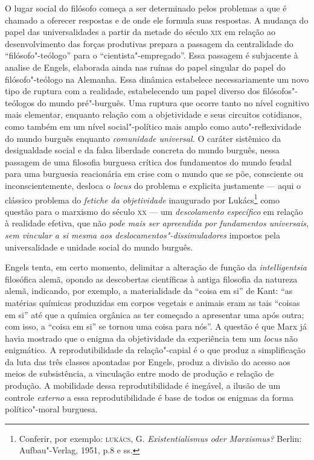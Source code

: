 O lugar social do filósofo começa a ser determinado pelos problemas a
que é chamado a oferecer respostas e de onde ele formula suas respostas.
A mudança do papel das universalidades a partir da metade do século
\textsc{xix} em relação ao desenvolvimento das forças produtivas prepara
a passagem da centralidade do ``filósofo"-teólogo'' para o
``cientista"-empregado''. Essa passagem é subjacente à analise de
Engels, elaborada ainda nas ruínas do papel singular do papel do
filósofo"-teólogo na Alemanha. Essa dinâmica estabelece necessariamente
um novo tipo de ruptura com a realidade, estabelecendo um papel diverso
dos filósofos"-teólogos do mundo pré"-burguês. Uma ruptura que ocorre
tanto no nível cognitivo mais elementar, enquanto relação com a
objetividade e seus circuitos cotidianos, como também em um nível
social"-político mais amplo como auto"-reflexividade do mundo burguês
enquanto \emph{comunidade universal.} O caráter sistêmico da
desigualdade social e da falsa liberdade concreta do mundo burguês,
nessa passagem de uma filosofia burguesa crítica dos fundamentos do
mundo feudal para uma burguesia reacionária em crise com o mundo que se
põe, consciente ou inconscientemente, desloca o \emph{locus} do problema
e explicita justamente --- aqui o clássico problema do \emph{fetiche da
objetividade} inaugurado por Lukács\footnote{Conferir, por exemplo:
  \textsc{lukács}, G. \emph{Existentialismus oder Marxismus?} Berlin:
  Aufbau"-Verlag, 1951, p.8 e ss.} como questão para o marxismo do
século \textsc{xx} --- um \emph{descolamento específico} em relação à
realidade efetiva, que não \emph{pode mais ser apreendida por
fundamentos universais, sem vincular a si mesma aos
deslocamentos"-dissimuladores} impostos pela universalidade e unidade
social do mundo burguês.

Engels tenta, em certo momento, delimitar a alteração de função da
\emph{intelligentsia} filosófica alemã, opondo as descobertas
científicas à antiga filosofia da natureza alemã, indicando, por
exemplo, a materialidade da ``coisa em si'' de Kant: ``as matérias
químicas produzidas em corpos vegetais e animais eram as tais ``coisas
em si'' até que a química orgânica as ter começado a apresentar uma após
outra; com isso, a ``coisa em si'' se tornou uma coisa para nós''. A
questão é que Marx já havia mostrado que o enigma da objetividade da
experiência tem um \emph{locus} não enigmático. A reprodutibilidade da
relação"-capial é o que produz a simplificação da luta das três classes
apontadas por Engels, produz a divisão do acesso aos meios de
subsistência, a vinculação entre modo de produção e relação de produção.
A mobilidade dessa reprodutibilidade é inegável, a ilusão de um controle
\emph{externo} a essa reprodutibilidade é base de todos os enigmas da
forma político"-moral burguesa.


